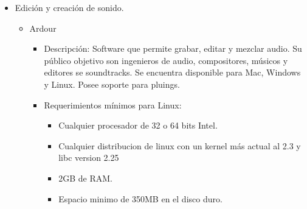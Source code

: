 \begin{itemize}
		\item Edición y creación de sonido.
			\begin{itemize}
				\item Ardour
					\begin{itemize}
						\item Descripción: Software que permite grabar, editar y mezclar audio. Su público objetivo son ingenieros de audio, compositores, músicos y editores se soundtracks. Se encuentra disponible para Mac, Windows y Linux. Posee soporte para pluings.
						\item Requerimientos mínimos para Linux:
						\begin{itemize}
							\item Cualquier procesador de 32 o 64 bits Intel.
							\item Cualquier distribucion de linux con un kernel más actual al 2.3 y libc version 2.25 
							\item 2GB de RAM.
							\item Espacio minimo de 350MB en el disco duro.

						\end{itemize}
					\end{itemize}
			\end{itemize}
\end{itemize}